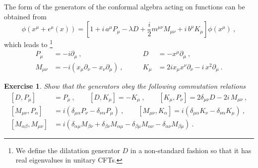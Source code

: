 \documentclass{ws-rv9x6}
\newtheorem{exercise}{Exercise}[section]
\newcommand\be{\begin{equation}}
\newcommand\ee{\end{equation}}
\begin{document}
The form of the generators of the conformal algebra acting on functions
can be obtained from 
\be
\phi\left(x^{\mu}+\epsilon^{\mu}(x)\right)=\left[1+i\, a^{\mu}P_{\mu}-\lambda D+\frac{i}{2}m^{\mu\nu}M_{\mu\nu}+i\, b^{\mu}K_{\mu}\right]\phi\left(x^{\mu}\right)\ ,
\ee
which leads to \footnote{We define the dilatation generator $D$ in a non-standard fashion so that it has real eigenvalues in unitary CFTs.}
\begin{align}
P_{\mu}&=-i\partial_{\mu}\ ,\qquad &D&=-x^{\mu}\partial_{\mu}\ ,\\
 M_{\mu\nu}&=-i\left(x_{\mu}\partial_{\nu}-x_{\nu}\partial_{\mu}\right)\ ,\qquad &K_{\mu}&=2ix_{\mu}x^{\nu}\partial_{\nu}-i\, x^{2}\partial_{\mu}\ .
\end{align}
\begin{exercise}
Show that the generators obey the following commutation
relations
\begin{align}
\left[D,P_{\mu}\right]&=P_{\mu}\ ,\qquad\left[D,K_{\mu}\right]=-K_{\mu}\ ,\qquad\left[K_{\mu},P_{\nu}\right]=2\delta_{\mu\nu}D-2i\, M_{\mu\nu}\ ,\nonumber \\
\left[M_{\mu\nu},P_{\alpha}\right]&=i\left(\delta_{\mu\alpha}P_{\nu}-\delta_{\nu\alpha}P_{\mu}\right)\ ,\qquad\left[M_{\mu\nu},K_{\alpha}\right]=i\left(\delta_{\mu\alpha}K_{\nu}-\delta_{\nu\alpha}K_{\mu}\right)\ ,\nonumber \\
\left[M_{\alpha\beta},M_{\mu\nu}\right]&=i\left(\delta_{\alpha\mu}M_{\beta\nu}+\delta_{\beta\nu}M_{\alpha\mu}-\delta_{\beta\mu}M_{\alpha\nu}-\delta_{\alpha\nu}M_{\beta\mu}\right)\ .\label{eq:conformalalgebra}
\end{align}
\end{exercise}


\end{document}
